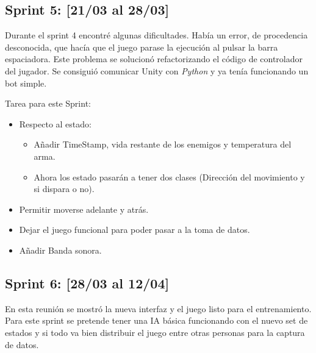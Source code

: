 \subsection{Sprint 5: [21/03 al 28/03]}

Durante el sprint 4 encontré algunas dificultades. Había un error, de procedencia desconocida, que hacía que el juego parase la ejecución al pulsar la barra espaciadora. Este problema se solucionó refactorizando el código de controlador del jugador. Se consiguió comunicar Unity con \emph{Python} y ya tenía funcionando un bot simple.

Tarea para este Sprint: 
\begin{itemize}
    \item Respecto al estado:
    \begin{itemize}
        \item Añadir TimeStamp, vida restante de los enemigos y temperatura del arma.
        \item Ahora los estado pasarán a tener dos clases (Dirección del movimiento y si dispara o no).
    \end{itemize}
    \item Permitir moverse adelante y atrás.
    \item Dejar el juego funcional para poder pasar a la toma de datos.
    \item Añadir Banda sonora.
\end{itemize}


\subsection{Sprint 6: [28/03 al 12/04]}

En esta reunión se mostró la nueva interfaz y el juego listo para el entrenamiento. Para este sprint se pretende tener una IA básica funcionando con el nuevo set de estados y si todo va bien distribuir el juego entre otras personas para la captura de datos.

